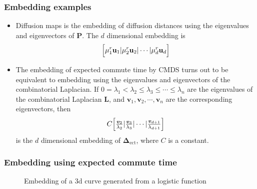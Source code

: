 \documentclass[professionalfonts,hyperref={pdfpagelabels=false,colorlinks=true,linkcolor=red}]{beamer}
\begin{document}
\begin{frame}
  \frametitle{Embedding examples}
  \begin{itemize}
    \item<1-> Diffusion maps \cite{coifman06:_diffus_maps} is the
      embedding of diffusion distances using the eigenvalues and
      eigenvectors of $\mathbf{P}$. The $d$ dimensional embedding is
      \begin{equation*}
        \Bigl[ \mu_1^{r} \mathbf{u}_1 | \mu_{2}^{r} \mathbf{u}_2 |
        \cdots | \mu_{d}^{r}  \mathbf{u}_d \Bigr]
      \end{equation*}
    \item<2> The embedding of expected commute time by CMDS turns out
      to be equivalent to embedding using the eigenvalues and
      eigenvectors of the combinatorial
      Laplacian. If $0 = \lambda_1 < \lambda_2 \leq \lambda_3 \leq \cdots
      \leq \lambda_{n}$ are the eigenvalues of the combinatorial
      Laplacian $\mathbf{L}$, and $\bm{v}_1, \bm{v}_2, \cdots,
      \bm{v}_n$ are the corresponding eigenvectors, then
      \begin{equation}
        \label{eq:1}
        C \Bigl[ \tfrac{\bm{v}_{2}}{\lambda_2} |
        \tfrac{\bm{v}_3}{\lambda_3}
        | \cdots | \tfrac{\bm{v}_{d+1}}{\lambda_{d+1}} \Bigr]
      \end{equation}
      is the $d$ dimensional embedding of
      $\bm{\Delta}_{\mathrm{ect}}$, where $C$ is a constant.  
  \end{itemize}
\end{frame}

\begin{frame}
\frametitle{Embedding using expected commute time}
  \subfiglabelskip=0pt
  \begin{figure}[htbp]
    \label{fig:logistic}
    \centering
    \hspace{3pt}
    \caption{Embedding of a 3d curve generated from a logistic function}
  \end{figure}
\
\end{frame}

\begin{frame}

\end{frame}
\end{document}
